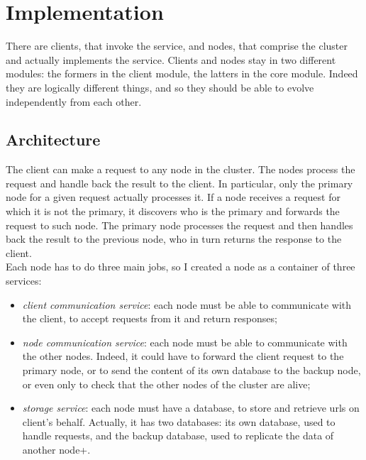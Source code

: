\documentclass{article}
\begin{document}
\section{Implementation}  
There are clients, that invoke the service, and nodes, that comprise the cluster and actually implements the service. Clients and nodes stay in two different modules: the formers in the client module, the latters in the core module. Indeed they are logically different things, and so they should be able to evolve independently from each other. 

\subsection{Architecture} 

The client can make a request to any node in the cluster. The nodes process the request and handle back the result to the client.  In particular, only the primary node for a given request actually processes it. If a node receives a request for which it is not the primary, it discovers who is the primary and forwards the request to such node. The primary node processes the request and then handles back the result to the previous node, who in turn returns the response to the client. \\
Each node has to do three main jobs, so I created a node as a container of three services: 
\begin{itemize}
\item \textit{client communication service}: each node must be able to communicate with the client, to accept requests from it and return responses;
\item \textit{node communication service}: each node must be able to communicate with the other nodes. Indeed, it could have to forward the client request to the primary node, or to send the content of its own database to the backup node, or even only to check that the other nodes of the cluster are alive;
\item \textit{storage service}: each node must have a database, to store and retrieve urls on client's behalf. Actually, it has two databases: its own database, used to handle requests, and the backup database, used to replicate the data of another node+.
\end{itemize}
\end{document}
